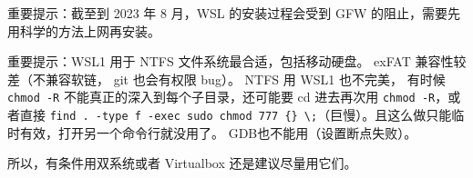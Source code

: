 
\begin{issues}
\issueDraft
\end{issues}

重要提示：截至到 2023 年 8 月，WSL 的安装过程会受到 GFW 的阻止，需要先用科学的方法上网再安装。

重要提示：WSL1 用于 NTFS 文件系统最合适，包括移动硬盘。 exFAT 兼容性较差（不兼容软链， git 也会有权限 bug）。 NTFS 用 WSL1 也不完美， 有时候 \verb|chmod -R| 不能真正的深入到每个子目录，还可能要 cd 进去再次用 \verb|chmod -R|，或者直接 \verb|find . -type f -exec sudo chmod 777 {} \;|（巨慢）。且这么做只能临时有效，打开另一个命令行就没用了。 GDB也不能用（设置断点失败）。

所以，有条件用双系统或者 Virtualbox 还是建议尽量用它们。

